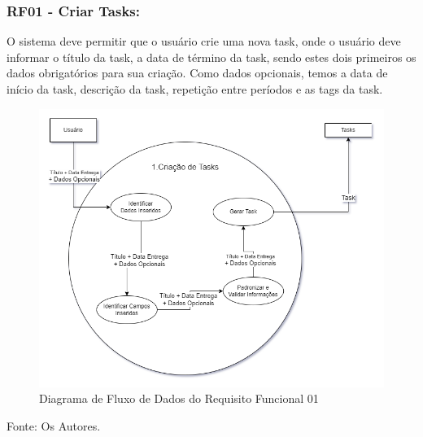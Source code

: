 \documentclass[a4paper,12pt]{article}
\begin{document}
\pagebreak
\subsubsection{RF01 - Criar Tasks:}

O sistema deve permitir que o usuário crie uma nova task, onde o usuário deve informar o título da task, a data 
de término da task, sendo estes dois primeiros os dados obrigatórios para sua criação. Como dados opcionais, temos a 
data de início da task, descrição da task, repetição entre períodos e as tags da task.
\begin{figure}[H]
	\centering
	\includegraphics[scale=0.45]{DFDs/RF01.drawio.png}
	\caption{Diagrama de Fluxo de Dados do Requisito Funcional 01}
\end{figure}
\noindent Fonte: Os Autores.
\end{document}
